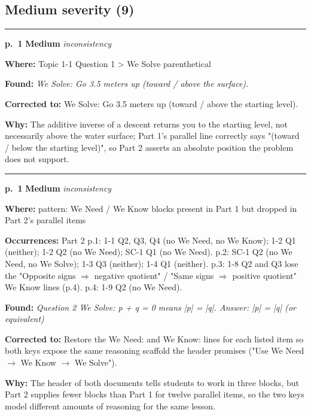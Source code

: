 \documentclass[11pt]{article}
\newcommand{\sevmed}[1]{\textcolor{orange!80!black}{\textbf{#1}}}
\begin{document}
\subsection*{Medium severity (9)}
\noindent\rule{\textwidth}{0.4pt}\par\nobreak\vspace{2pt}
\noindent\textbf{p.~1} \quad \sevmed{Medium} \quad \textit{inconsistency}\par
\noindent\textbf{Where: }Topic 1-1 Question 1 > We Solve parenthetical\par
\noindent\textbf{Found: }\textit{We Solve: Go 3.5 meters up (toward / above the surface).}\par
\noindent\textbf{Corrected to: }We Solve: Go 3.5 meters up (toward / above the starting level).\par
\noindent\textbf{Why: }The additive inverse of a descent returns you to the starting level, not necessarily above the water surface; Part 1's parallel line correctly says "(toward / below the starting level)", so Part 2 asserts an absolute position the problem does not support.\par\vspace{4pt}
\noindent\rule{\textwidth}{0.4pt}\par\nobreak\vspace{2pt}
\noindent\textbf{p.~1} \quad \sevmed{Medium} \quad \textit{inconsistency}\par
\noindent\textbf{Where: }pattern: We Need / We Know blocks present in Part 1 but dropped in Part 2's parallel items\par
\noindent\textbf{Occurrences: }Part 2 p.1: 1-1 Q2, Q3, Q4 (no We Need, no We Know); 1-2 Q1 (neither); 1-2 Q2 (no We Need); SC-1 Q1 (no We Need). p.2: SC-1 Q2 (no We Need, no We Solve); 1-3 Q3 (neither); 1-4 Q1 (neither). p.3: 1-8 Q2 and Q3 lose the "Opposite signs $\Rightarrow$ negative quotient" / "Same signs $\Rightarrow$ positive quotient" We Know lines (p.4). p.4: 1-9 Q2 (no We Need).\par
\noindent\textbf{Found: }\textit{Question 2 We Solve: p + q = 0 means |p| = |q|. Answer: |p| = |q| (or equivalent)}\par
\noindent\textbf{Corrected to: }Restore the We Need: and We Know: lines for each listed item so both keys expose the same reasoning scaffold the header promises ("Use We Need $\to$ We Know $\to$ We Solve").\par
\noindent\textbf{Why: }The header of both documents tells students to work in three blocks, but Part 2 supplies fewer blocks than Part 1 for twelve parallel items, so the two keys model different amounts of reasoning for the same lesson.\par\vspace{4pt}
\end{document}
